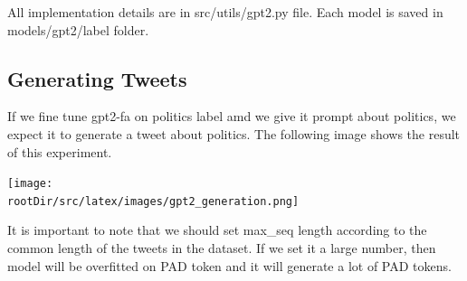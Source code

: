 \documentclass[12pt, letterpaper]{article}
\def\rootDir{../..}
\begin{document}
    \begin{figure}[H]

    \end{figure}
    All implementation details are in src\slash utils\slash gpt2.py file. Each model is saved in models\slash gpt2\slash label folder.

    \subsection{Generating Tweets}\label{sec:generating-tweets}
    If we fine tune gpt2-fa on politics label amd we give it prompt about politics, we expect it to generate a tweet about politics. The following image shows the result of this experiment.
    \begin{center}
        \texttt{[image: \\rootDir/src/latex/images/gpt2\_generation.png]}
    \end{center}
    It is important to note that we should set max\_seq length according to the common length of the tweets in the dataset. If we set it a large number, then model will be overfitted on PAD token and it will generate a lot of PAD tokens.
\end{document}
